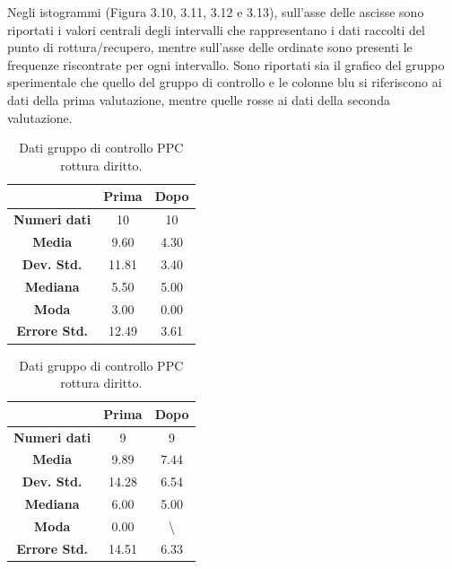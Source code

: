 Negli istogrammi (Figura 3.10, 3.11, 3.12 e 3.13), sull’asse delle ascisse sono riportati i valori centrali degli intervalli che rappresentano i dati raccolti del punto di rottura/recupero, mentre sull’asse delle ordinate sono presenti le frequenze riscontrate per ogni intervallo. Sono riportati sia il grafico del gruppo sperimentale che quello del gruppo di controllo e le colonne blu si riferiscono ai dati della prima valutazione, mentre quelle rosse ai dati della seconda valutazione.
\begin{table}
\centering
\setlength\tabcolsep{4pt}
\begin{minipage}{0.48\textwidth}
\centering

\begin{tabular}{|c|c|c|} \hline
{\textbf{}} & {\textbf{  \hspace{8pt}Prima\hspace{8pt} }} & {\textbf{ \hspace{8pt}Dopo\hspace{8pt}  }}\\ \hline
\textbf{Numeri dati} & 10 & 10 \\ 
\textbf{Media} & 9.60 & 4.30 \\  
\textbf{Dev. Std.} & 11.81 & 3.40 \\  
\textbf{Mediana} & 5.50 & 5.00 \\ 
\textbf{Moda} & 3.00 & 0.00 \\ 
\textbf{Errore Std.} & 12.49 & 3.61 \\ 
\hline
\end{tabular}
\caption{Dati gruppo sperimentale PPC rottura diritto.}

\label{tab:accuracy} 
\end{minipage}%
\hfill
\begin{minipage}{0.48\textwidth}
\centering

\begin{tabular}{|c|c|c|} \hline
{\textbf{}} & {\textbf{  \hspace{8pt}Prima\hspace{8pt} }} & {\textbf{ \hspace{8pt}Dopo\hspace{8pt}  }}\\ \hline
\textbf{Numeri dati} & 9 & 9 \\ 
\textbf{Media} & 9.89 & 7.44 \\  
\textbf{Dev. Std.} & 14.28 & 6.54 \\  
\textbf{Mediana} & 6.00 & 5.00 \\  
\textbf{Moda} & 0.00 & \textbackslash \\
\textbf{Errore Std.} & 14.51 & 6.33 \\
\hline
\end{tabular}
\caption{Dati gruppo di controllo PPC rottura diritto.}


\end{minipage}
\end{table}
